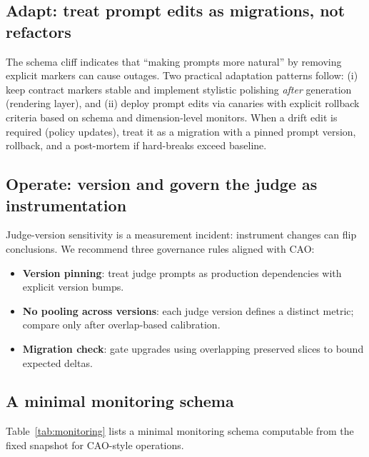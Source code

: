 \documentclass{article}
\begin{document}
\subsection{Adapt: treat prompt edits as migrations, not refactors}
The schema cliff indicates that ``making prompts more natural'' by removing explicit markers can cause outages.
Two practical adaptation patterns follow:
(i) keep contract markers stable and implement stylistic polishing \emph{after} generation (rendering layer), and
(ii) deploy prompt edits via canaries with explicit rollback criteria based on schema and dimension-level monitors.
When a drift edit is required (policy updates), treat it as a migration with a pinned prompt version, rollback, and a post-mortem if hard-breaks exceed baseline.

\subsection{Operate: version and govern the judge as instrumentation}
Judge-version sensitivity is a measurement incident: instrument changes can flip conclusions.
We recommend three governance rules aligned with CAO:
\begin{itemize}[leftmargin=1.2em, itemsep=2pt, topsep=2pt]
  \item \textbf{Version pinning}: treat judge prompts as production dependencies with explicit version bumps.
  \item \textbf{No pooling across versions}: each judge version defines a distinct metric; compare only after overlap-based calibration.
 \item \textbf{Migration check}: gate upgrades using overlapping preserved slices to bound expected deltas.
\end{itemize}

\subsection{A minimal monitoring schema}
Table~\ref{tab:monitoring} lists a minimal monitoring schema computable from the fixed snapshot for CAO-style operations.
 
\end{document}
